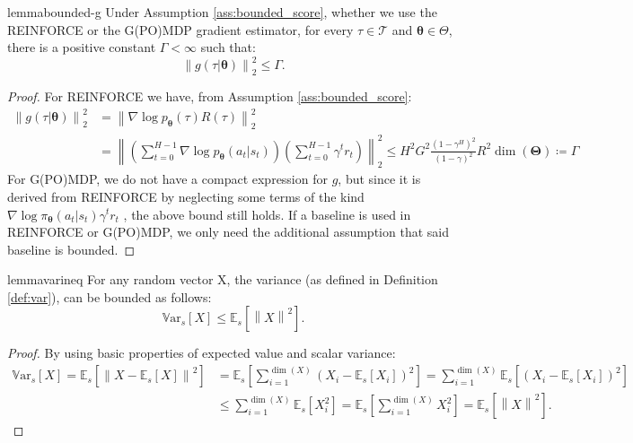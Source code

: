 \documentclass{article}
\theoremstyle{remark}
\theoremstyle{definition}
\newcommand{\norm}[2][\infty]{\left\|#2\right\|_{#1}}
\newcommand{\vtheta}{\boldsymbol{\theta}}
\newcommand{\Tspace}{\mathcal{T}}
\newcommand{\score}[2]{\nabla\log p_{#1}(#2)}
\newcommand{\vTheta}{\boldsymbol{\Theta}}
\newcommand{\Es}[1]{\mathbb{E}_{s}\left[#1\right]}
\newcommand{\Vars}[1]{{\mathbb{V}\text{ar}}_{s}\left[#1\right]}
\begin{document}
\begin{restatable}[]{lemma}{bounded-g}\label{lemma:gbound}
Under Assumption \ref{ass:bounded_score}, whether we use the REINFORCE or the G(PO)MDP gradient estimator, for every $\tau\in\Tspace$ and $\vtheta\in\Theta$, there is a positive constant $\Gamma<\infty$ such that:
\[
	\norm[2]{g(\tau\vert\vtheta)}^2 \leq \Gamma.
\]
\end{restatable}
\begin{proof}
For REINFORCE we have, from Assumption \ref{ass:bounded_score}:
\begin{align*}
	\norm[2]{g(\tau\vert\vtheta)}^2 &=
	\norm[2]{\score{\vtheta}{\tau}R(\tau)}^2 \\
	&=\norm[2]{\left(\sum_{t=0}^{H-1}\score{\vtheta}{a_t\vert s_t}\right)\left(\sum_{t=0}^{H-1}\gamma^t r_t\right)}^2\leq H^2G^2\frac{(1-\gamma^H)^2}{(1-\gamma)^2}R^2\dim(\vTheta) \coloneqq \Gamma
\end{align*}
For G(PO)MDP, we do not have a compact expression for $g$, but since it is derived from REINFORCE by neglecting some terms of the kind $\nabla \log \pi_{\vtheta}(a_t | s_t)\gamma^t r_t$ \cite{baxter2001infinite,peters2008reinforcement}, the above bound still holds.
If a baseline is used in REINFORCE or G(PO)MDP, we only need the additional assumption that said baseline is bounded.
\end{proof}

\begin{restatable}[]{lemma}{varineq}\label{lemma:varineq}
For any random vector X, the variance (as defined in Definition \ref{def:var}), can be bounded as follows:
\[
	\Vars{X} \leq \Es{\norm[]{X}^2}.
\]
\end{restatable}
\begin{proof}
By using basic properties of expected value and scalar variance:
\begin{align*}
	\Vars{X} = \Es{\norm[]{X-\Es{X}}^2} &= \Es{\sum_{i=1}^{\dim(X)}\left(X_i-\Es{X_i}\right)^2} = \sum_{i=1}^{\dim(X)}\Es{\left(X_i-\Es{X_i}\right)^2} \\
	&\leq \sum_{i=1}^{\dim(X)}\Es{X_i^2} = \Es{\sum_{i=1}^{\dim(X)}X_i^2} = \Es{\norm[]{X}^2}.
\end{align*}
\end{proof}
\end{document}
